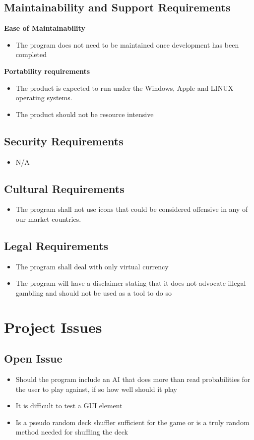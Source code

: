 \documentclass[12pt]{article}
\begin{document}
	\subsection{Maintainability and Support Requirements}
	\textbf{Ease of Maintainability}
	\begin{itemize}
	\item	The program does not need to be maintained once development has been completed
	\end{itemize}
	\textbf{Portability requirements}
	\begin{itemize}
	\item	The product is expected to run under the Windows, Apple and LINUX operating 				systems.
	\item 	The product should not be resource intensive
	\end{itemize}

	\subsection{Security Requirements}
	\begin{itemize}
	\item 	N/A
	\end{itemize}
	\subsection{Cultural Requirements}
	\begin{itemize}
	\item 	The program shall not use icons that could be considered offensive in any of 				our market countries.
	\end{itemize}
	\subsection{Legal Requirements}
	\begin{itemize}
	\item	The program shall deal with only virtual currency
	\item 	The program will have a disclaimer stating that it does not advocate illegal 				gambling and should not be used as a tool to do so
	\end{itemize}
	\section{Project Issues}
	\subsection{Open Issue}
	\begin{itemize}
	\item	Should the program include an AI that does more than read probabilities for the 			user to play against, if so how well should it play
	\item	It is difficult to test a GUI element
	\item	Is a pseudo random deck shuffler sufficient for the game or is a truly random 				method needed for shuffling the deck
	\end{itemize}
\end{document}
